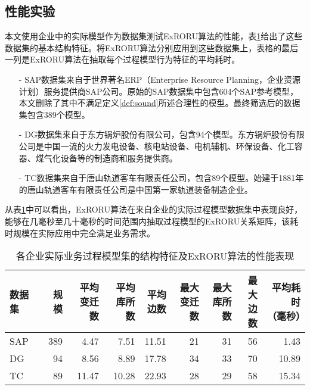 \subsection{性能实验}\label{subsec:efficiency}
本文使用企业中的实际模型作为数据集测试ExRORU算法的性能，表\ref{tab:efficiency_dataset}给出了这些数据集的基本结构特征。将ExRORU算法分别应用到这些数据集上，表格的最后一列是ExRORU算法在抽取每个过程模型行为特征的平均耗时。
\begin{itemize}
  \item[-] SAP数据集来自于世界著名ERP（Enterprise Resource Planning，企业资源计划）服务提供商SAP公司。原始的SAP数据集中包含604个SAP参考模型，本文删除了其中不满足定义\ref{def:sound}所述合理性的模型。最终筛选后的数据集包含389个模型。
  \item[-] DG数据集来自于东方锅炉股份有限公司，包含94个模型。东方锅炉股份有限公司是中国一流的火力发电设备、核电站设备、电机辅机、环保设备、化工容器、煤气化设备等的制造商和服务提供商。
  \item[-] TC数据集来自于唐山轨道客车有限责任公司，包含89个模型。始建于1881年的唐山轨道客车有限责任公司是中国第一家轨道装备制造企业。
\end{itemize}

从表\ref{tab:efficiency_dataset}中可以看出，ExRORU算法在来自企业的实际过程模型数据集中表现良好，能够在几毫秒至几十毫秒的时间范围内抽取过程模型的ExRORU关系矩阵，该耗时规模在实际应用中完全满足业务需求。

\begin{table}[htbp]
  \centering
  \caption{各企业实际业务过程模型集的结构特征及ExRORU算法的性能表现}
  \label{tab:efficiency_dataset}
  \begin{tabular}{lrrrrrrrr}
    \toprule[1.5pt]
    数据集 & 规模 & \tabincell{r}{平均\\变迁数} & \tabincell{r}{平均\\库所数} & \tabincell{r}{平均\\边数} & \tabincell{r}{最大\\变迁数} & \tabincell{r}{最大\\库所数} & \tabincell{r}{最大\\边数} & \tabincell{r}{平均耗时\\（毫秒）}\\ \midrule[1pt]
    SAP & 389 & 4.47 & 7.51 & 11.51 & 21 & 31 & 56 & 1.43\\
    DG & 94 & 8.56 & 8.89 & 17.78 & 34 & 33 & 70 & 10.89\\
    TC & 89 & 11.47 & 10.28 & 22.93 & 28 & 29 & 58 & 15.34\\
    \bottomrule[1.5pt]
  \end{tabular}
\end{table}

